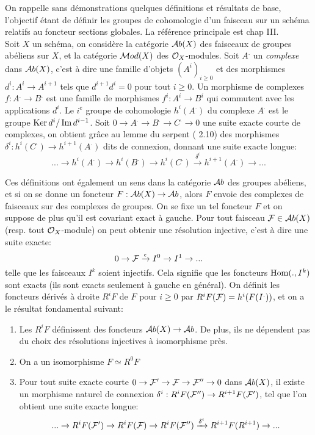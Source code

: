 \noindent On rappelle sans démonstrations quelques définitions et résultats de base, l'objectif étant de définir les groupes de cohomologie d'un faisceau sur un schéma relatifs au foncteur sections globales. La référence principale est \cite{Hartshorne} chap III.\\

Soit $X$ un schéma, on considère la catégorie $\mathcal{A} b(X)$ des faisceaux de groupes abéliens sur $X$, et la catégorie $\mathcal{M} od(X)$ des $\mathcal{O}_X$-modules. Soit $A^.$ un \textit{complexe} dans $\mathcal{A} b(X)$, c'est à dire une famille d'objets $(A^i)_{i\geq 0}$ et des morphismes $d^i:A^i\rightarrow A^{i+1}$ tels que $d^{i+1}d^i=0$ pour tout $i\geq 0$. Un morphisme de complexes $f:A^.\rightarrow B^.$ est une famille de morphismes $f^i:A^i\rightarrow B^i$ qui commutent avec les applications $d^i$. Le $i^e$ groupe de cohomologie $h^i(A^.)$ du complexe $A^.$ est le groupe $\operatorname{Ker} d^i/\operatorname{Im} d^{i-1}$. Soit $0\rightarrow A^.\rightarrow B^. \rightarrow C^. \rightarrow 0$ une suite exacte courte de complexes, on obtient grâce au lemme du serpent (\cite{atiyahmacdo} 2.10) des morphismes $\delta ^i:h^i(C^.)\rightarrow h^{i+1}(A^.) $ dits de connexion, donnant une suite exacte longue:
\begin{equation}\label{eq:longSES}
...\rightarrow h^i(A^.) \rightarrow h^i(B^.) \rightarrow h^i(C^.) \xrightarrow{\delta ^i} h^{i+1}(A^.) \rightarrow ...
\end{equation}

Ces définitions ont également un sens dans la catégorie $\mathcal{A} b$ des groupes abéliens, et si on se donne un foncteur $F:\mathcal{A} b(X)\rightarrow \mathcal{A} b$, alors $F$ envoie des complexes de faisceaux sur des complexes de groupes. On se fixe un tel foncteur $F$ et on suppose de plus qu'il est covariant exact à gauche. Pour tout faisceau $\mathcal{F}\in \mathcal{A} b(X)$ (resp. tout $\mathcal{O}_X$-module) on peut obtenir une résolution injective, c'est à dire une suite exacte:
$$0\rightarrow \mathcal{F} \xrightarrow{\epsilon} I^0\rightarrow I^1\rightarrow ...$$
telle que les faisceaux $I^k$ soient injectifs. Cela signifie que les foncteurs $\operatorname{Hom}(.,I^k)$ sont exacts (ils sont exacts seulement à gauche en général). On définit les foncteurs dérivés à droite $R^iF$ de $F$ pour $i\geq 0$ par $R^i F(\mathcal{F})=h^i(F(I^.))$, et on a le résultat fondamental suivant:

\begin{thm}
\begin{enumerate}
\item Les $R^i F$ définissent des foncteurs $\mathcal{A} b(X)\rightarrow \mathcal{A} b$. De plus, ils ne dépendent pas du choix des résolutions injectives à isomorphisme près.
\item On a un isomorphisme $F\simeq R^0F$
\item Pour tout suite exacte courte $0\rightarrow \mathcal{F}'\rightarrow \mathcal{F} \rightarrow \mathcal{F}'' \rightarrow 0$ dans $\mathcal{A} b(X)$, il existe un morphisme naturel de connexion $\delta^i:R^iF(\mathcal{F}'')\rightarrow R^{i+1}F(\mathcal{F}')$, tel que l'on obtient une suite exacte longue:
$$...\rightarrow R^iF(\mathcal{F}') \rightarrow R^iF(\mathcal{F}) \rightarrow R^iF(\mathcal{F}'') \xrightarrow{\delta ^i} R^{i+1}F(R^{i+1}) \rightarrow ...$$
\end{enumerate}
\end{thm}

